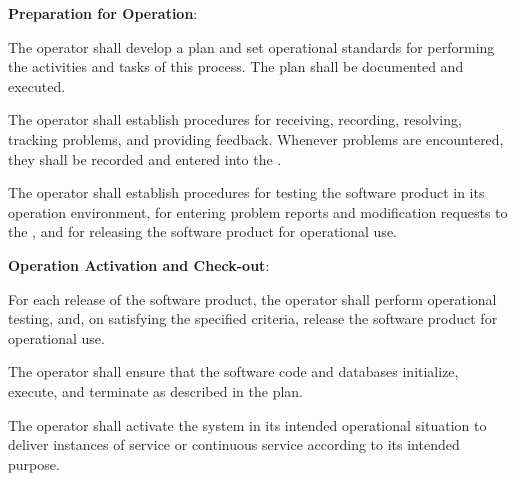 			\begin{adjustwidth}{2em}{0pt} 

				\begin{compactenum}

					\item {\bf Preparation for Operation}:

					\begin{compactenum}

						\item The operator shall develop a plan and set operational standards for performing the activities and tasks of this process. The plan shall be documented and executed.

						\item The operator shall establish procedures for receiving, recording, resolving, tracking problems, and providing feedback. Whenever problems are encountered, they shall be recorded and entered into the .

						\item The operator shall establish procedures for testing the software product in its operation environment, for entering problem reports and modification requests to the , and for releasing the software product for operational use.

					\end{compactenum}

					\item {\bf Operation Activation and Check-out}:

					\begin{compactenum}

						\item For each release of the software product, the operator shall perform operational testing, and, on satisfying the specified criteria, release the software product for operational use.

						\item The operator shall ensure that the software code and databases initialize, execute, and terminate as described in the plan.

						\item The operator shall activate the system in its intended operational situation to deliver instances of service or continuous service according to its intended purpose.

					\end{compactenum}


\end{compactenum}
\end{adjustwidth}
